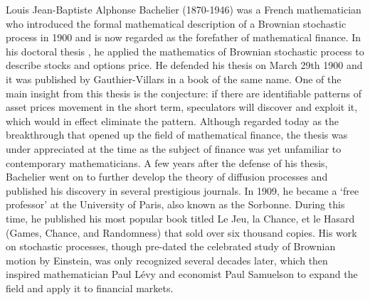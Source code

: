 \documentclass{article}
\begin{document}
Louis Jean-Baptiste Alphonse Bachelier (1870-1946) was a French mathematician who introduced the formal mathematical description of a Brownian stochastic process in 1900 and is now regarded as the forefather of mathematical finance. In his doctoral thesis \cite{Bach1}, he applied the mathematics of Brownian stochastic process to describe stocks and options price. He defended his thesis on March 29th 1900 and it was published by
Gauthier-Villars in a book of the same name. One of the main insight from this thesis is the conjecture: if there are identifiable patterns of asset prices movement in the short term, speculators will discover and exploit it, which would in effect eliminate the pattern. Although regarded today as the breakthrough that opened up the field of mathematical finance, the thesis was under appreciated at the time as the subject of finance was yet unfamiliar to contemporary mathematicians. A few years after the defense of his thesis, Bachelier went on to further develop the theory of diffusion processes and published his discovery in several prestigious journals. In 1909, he became a ‘free professor’ at the University of Paris, also known
as the Sorbonne. During this time, he published his most popular book titled Le Jeu, la Chance, et le Hasard (Games, Chance, and Randomness) that sold over six thousand copies. His work on stochastic processes, though pre-dated the celebrated study of Brownian motion by Einstein, was only recognized several decades later, which then inspired mathematician Paul Lévy and economist Paul Samuelson to expand the field and apply it to financial markets. \\
\end{document}
